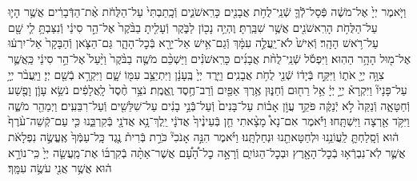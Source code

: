 \documentclass[twoside, openany, parskip=half, 11pt]{book}
\begin{document}
\begin{sometimes}
\begin{footnotesize}
\begin{multicols}{2}

\\
\\
וַיֹּ֤אמֶר יְיָ֙ אֶל־מֹשֶׁ֔ה פְּֿסָל־לְֿֿךָ֛ שְֿׁנֵֽי־לֻחֹ֥ת אֲבָנִ֖ים כָּרִֽאשֹׁנִ֑ים וְֿכָֽתַבְתִּי֙ עַל־הַלֻּחֹ֔ת אֶ֨ת־הַדְּֿבָרִ֔ים אֲשֶׁ֥ר הָי֛וּ עַל־הַלֻּחֹ֥ת הָרִֽאשֹׁנִ֖ים אֲשֶׁ֥ר שִׁבַּֽרְתָּ׃ וֶהְיֵ֥ה נָכ֖וֹן לַבֹּ֑קֶר וְֿעָלִ֤יתָ בַבֹּ֨קֶר֙ אֶל־הַ֣ר סִינַ֔י וְֿנִצַּבְתָּ֥ לִ֛י שָׁ֖ם עַל־רֹ֥אשׁ הָהָֽר׃ וְֿאִישׁ֙ לֹא־יַֽעֲלֶ֣ה עִמָּ֔ךְ וְֿגַם־אִ֥ישׁ אַל־יֵרָ֖א בְּֿכׇל־הָהָ֑ר גַּם־הַצֹּ֤אן וְֿהַבָּקָר֙ אַל־יִרְע֔וּ אֶל־מ֖וּל הָהָ֥ר הַהֽוּא׃ וַיִּפְסֹ֡ל שְֿׁנֵֽי־לֻחֹ֨ת אֲבָנִ֜ים כָּרִֽאשֹׁנִ֗ים וַיַּשְׁכֵּ֨ם מֹשֶׁ֤ה בַבֹּ֨קֶר֙ וַיַּ֨עַל֙ אֶל־הַ֣ר סִינַ֔י כַּֽאֲשֶׁ֛ר צִוָּ֥ה יְיָ֖ אֹת֑וֹ וַיִּקַּ֣ח בְּֿיָד֔וֹ שְֿׁנֵ֖י לֻחֹ֥ת אֲבָנִֽים׃ וַיֵּ֤רֶד יְיָ֙ בֶּֽעָנָ֔ן וַיִּתְיַצֵּ֥ב עִמּ֖וֹ שָׁ֑ם וַיִּקְרָ֥א בְֿשֵׁ֖ם יְיָ׃ וַיַּֽעֲבֹ֨ר יְיָ֥ עַל־פָּנָיו֘ וַיִּקְרָא֒ יְיָ֣ יְיָ֔ אֵ֥ל רַח֖וּם וְֿחַנּ֑וּן אֶ֥רֶךְ אַפַּ֖יִם וְֿרַב־חֶ֥סֶד וֶֽאֱמֶֽת׃ נֹצֵ֥ר חֶ֨סֶד֙ לָֽאֲלָפִ֔ים נֹשֵׂ֥א עָוֹ֛ן וָפֶ֖שַׁע וְֿחַטָּאָ֑ה וְֿנַקֵּה֙ לֹ֣א יְֿנַקֶּ֔ה פֹּקֵ֣ד עֲוֹ֣ן אָב֗וֹת עַל־בָּנִים֙ וְֿעַל־בְּֿֿנֵ֣י בָנִ֔ים עַל־שִׁלֵּשִׁ֖ים וְֿעַל־רִבֵּעִֽים׃ וַיְמַהֵ֖ר מֹשֶׁ֑ה וַיִּקֹּ֥ד אַ֖רְצָה וַיִּשְׁתָּֽחוּ׃ וַיֹּ֡אמֶר אִם־נָא֩ מָצָ֨אתִי חֵ֤ן בְּֿעֵינֶ֨יךָ֙ אֲדֹנָ֔י יֵֽלֶךְ־נָ֥א אֲדֹנָ֖י בְּֿקִרְבֵּ֑נוּ כִּ֤י עַם־קְֿשֵׁה־עֹ֨רֶף֙ ה֔וּא וְֿסָֽלַחְתָּ֛ לַֽעֲוֹנֵ֥נוּ וּלְחַטָּאתֵ֖נוּ וּנְחַלְתָּֽנוּ׃ וַיֹּ֗אמֶר הִנֵּ֣ה אָנֹכִי֘ כֹּרֵ֣ת בְּֿרִית֒ נֶ֤גֶד כָּֽל־עַמְּֿךָ֙ אֶֽעֱשֶׂ֣ה נִפְלָאֹ֔ת אֲשֶׁ֛ר לֹֽא־נִבְרְֿא֥וּ בְֿכׇל־הָאָ֖רֶץ וּבְכׇל־הַגּוֹיִ֑ם וְֿרָאָ֣ה כׇל־הָ֠עָ֠ם אֲשֶׁר־אַתָּ֨ה בְֿקִרְבּ֜וֹ אֶת־מַֽעֲשֵׂ֤ה יְיָ֙ כִּֽי־נוֹרָ֣א ה֔וּא אֲשֶׁ֥ר אֲנִ֖י עֹשֶׂ֥ה עִמָּֽךְ׃

\end{multicols}
\end{footnotesize}
\end{sometimes}
\end{document}
